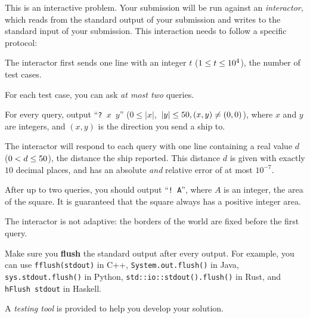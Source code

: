 \begin{Interaction}
	This is an interactive problem.
    Your submission will be run against an \emph{interactor},
    which reads from the standard output of your submission
    and writes to the standard input of your submission.
    This interaction needs to follow a specific protocol:

	The interactor first sends one line with an integer $t$ ($1 \leq t \leq 10^4$), the number of test cases.

    For each test case, you can ask \emph{at most two} queries.

    For every query, output ``\texttt{?~$x$~$y$}'' ($0 \leq \left| x \right|$,~$\left| y \right| \leq 50, (x, y) \neq (0, 0)$), where $x$ and $y$ are integers, and $(x, y)$ is the direction you send a ship to.

	The interactor will respond to each query with one line containing a real value $d$ ($0 < d \leq 50$), the distance the ship reported.
    This distance $d$ is given with exactly $10$ decimal places, and has an absolute \emph{and} relative error of at most $10^{-7}$.

    After up to two queries, you should output ``\texttt{!~A}'', where $A$ is an integer, the area of the square.
	It is guaranteed that the square always has a positive integer area.

	The interactor is not adaptive: the borders of the world are fixed before the first query.

    Make sure you \textbf{flush} the standard output after every output.
    For example, you can use \texttt{fflush(stdout)} in C++, \texttt{System.out.flush()} in Java, \texttt{sys.stdout.flush()} in Python, \texttt{std::io::stdout().flush()} in Rust, and \texttt{hFlush stdout} in Haskell.

    A \emph{testing tool} is provided to help you develop your solution.
\end{Interaction}
